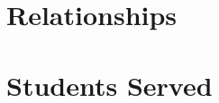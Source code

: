 \documentclass[
10pt, %
a4paper, %
oneside, %
headinclude,footinclude, %
BCOR5mm, %
]{scrartcl}
\begin{document}
  
\section{Relationships}



\section{Students Served}











% 


\end{document}
